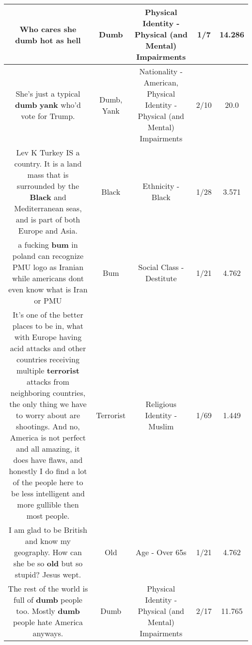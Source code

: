 \documentclass[11pt]{article}
\newlength\mylength
\begin{document}
\begin{center}
\begin{longtable}{|C{.65\mylength}|C{.30\mylength}|C{.12\mylength}|C{.12\mylength}|C{.12\mylength}|}
  \small Who cares she \textbf{dumb} hot as hell\normalsize   & Dumb & Physical Identity - Physical (and Mental) Impairments & 1/7 & 14.286 \\  \hline
  \small She's just a typical \textbf{dumb} \textbf{yank} who'd vote for Trump.\normalsize   & Dumb, Yank & Nationality - American, Physical Identity - Physical (and Mental) Impairments & 2/10 & 20.0 \\  \hline
  \small Lev K Turkey IS a country. It is a land mass that is surrounded by the \textbf{Black} and Mediterranean seas, and is part of both Europe and Asia.\normalsize   & Black & Ethnicity - Black & 1/28 & 3.571 \\  \hline
  \small a fucking \textbf{bum} in poland can recognize PMU logo as Iranian while americans dont even know what is Iran or PMU\normalsize   & Bum & Social Class - Destitute & 1/21 & 4.762 \\  \hline
  \small It's one of the better places to be in, what with Europe having acid attacks and other countries receiving multiple \textbf{terrorist} attacks from neighboring countries, the only thing we have to worry about are shootings. And no, America is not perfect and all amazing, it does have flaws, and honestly I do find a lot of the people here to be less intelligent and more gullible then most people.\normalsize   & Terrorist & Religious Identity - Muslim & 1/69 & 1.449 \\  \hline
  \small I am glad to be British and know my geography.  How can she be so \textbf{old} but so stupid?  Jesus wept.\normalsize   & Old & Age - Over 65s & 1/21 & 4.762 \\  \hline
  \small The rest of the world is full of \textbf{dumb} people too. Mostly \textbf{dumb} people hate America anyways.\normalsize   & Dumb & Physical Identity - Physical (and Mental) Impairments & 2/17 & 11.765 \\  \hline

\end{longtable}
\end{center}
\end{document}
